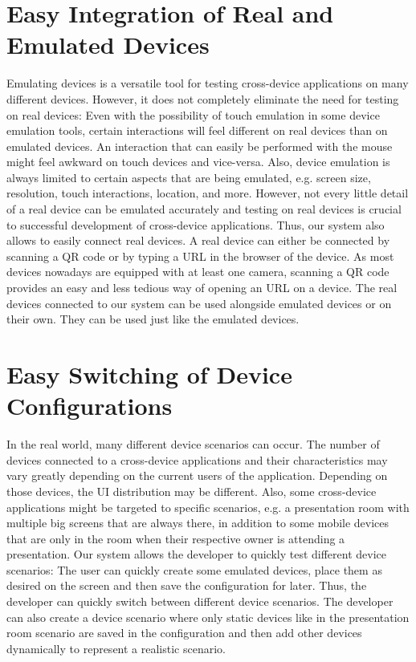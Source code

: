\section{Easy Integration of Real and Emulated Devices}

Emulating devices is a versatile tool for testing cross-device applications on many different devices. However, it does not completely eliminate the need for testing on real devices: Even with the possibility of touch emulation in some device emulation tools, certain interactions will feel different on real devices than on emulated devices. An interaction that can easily be performed with the mouse might feel awkward on touch devices and vice-versa. Also, device emulation is always limited to certain aspects that are being emulated, e.g. screen size, resolution, touch interactions, location, and more. However, not every little detail of a real device can be emulated accurately and testing on real devices is crucial to successful development of cross-device applications. Thus, our system also allows to easily connect real devices. A real device can either be connected by scanning a QR code or by typing a URL in the browser of the device. As most devices nowadays are equipped with at least one camera, scanning a QR code provides an easy and less tedious way of opening an URL on a device. The real devices connected to our system can be used alongside emulated devices or on their own. They can be used just like the emulated devices.

\section{Easy Switching of Device Configurations}

In the real world, many different device scenarios can occur. The number of devices connected to a cross-device applications and their characteristics may vary greatly depending on the current users of the application. Depending on those devices, the UI distribution may be different. Also, some cross-device applications might be targeted to specific scenarios, e.g. a presentation room with multiple big screens that are always there, in addition to some mobile devices that are only in the room when their respective owner is attending a presentation. Our system allows the developer to quickly test different device scenarios: The user can quickly create some emulated devices, place them as desired on the screen and then save the configuration for later. Thus, the developer can quickly switch between different device scenarios. The developer can also create a device scenario where only static devices like in the presentation room scenario are saved in the configuration and then add other devices dynamically to represent a realistic scenario. 


